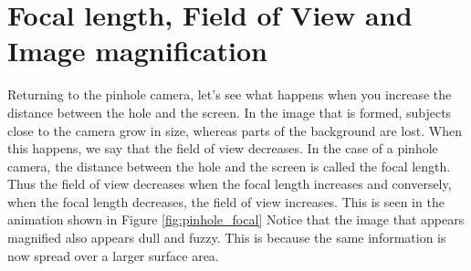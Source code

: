 \documentclass{../template/texnote}
\begin{document}



\section{Focal length, Field of View and Image magnification}
Returning to the pinhole camera, let's see what happens when you increase the distance between the hole and the screen. In the image that is formed, subjects close to the camera grow in size, whereas parts of the background are lost.
When this happens, we say that the field of view decreases. In the case of a pinhole camera, the distance between the hole and the screen is called the focal length. Thus the field of view decreases when the focal length increases and conversely, when the focal length decreases, the field of view increases. This is seen in the animation shown in Figure \ref{fig:pinhole_focal}
Notice that the image that appears magnified
also appears dull and fuzzy. This is because the same information is now spread over a larger surface area.
\end{document}
